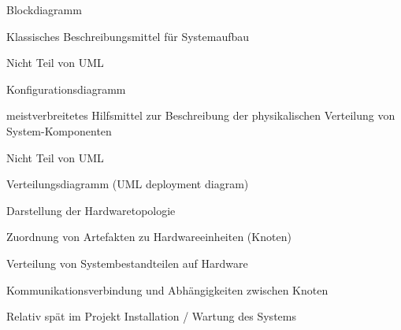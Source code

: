 \documentclass[a4paper]{article}
\begin{document}
\begin{multicols}{3}
  \begin{itemize*}
    \item Blockdiagramm
          \begin{itemize*}
            \item Klassisches Beschreibungsmittel für Systemaufbau
            \item Nicht Teil von UML
          \end{itemize*}
    \item Konfigurationsdiagramm
          \begin{itemize*}
            \item meistverbreitetes Hilfsmittel zur Beschreibung der physikalischen Verteilung von System-Komponenten
            \item Nicht Teil von UML
          \end{itemize*}
    \item Verteilungsdiagramm (UML deployment diagram)
          \begin{itemize*}
            \item Darstellung der Hardwaretopologie
            \item Zuordnung von Artefakten zu Hardwareeinheiten (Knoten)
                  \begin{itemize*}
                    \item Verteilung von Systembestandteilen auf Hardware
                  \end{itemize*}
            \item Kommunikationsverbindung und Abhängigkeiten zwischen Knoten
            \item Relativ spät im Projekt Installation / Wartung des Systems
          \end{itemize*}
  \end{itemize*}


\end{multicols}
\end{document}
